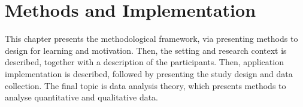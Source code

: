 \chapter{Methods and Implementation}\label{cha:Method}





This chapter presents the methodological framework, via presenting methods to design for learning and motivation. Then, the setting and research context is described, together with a description of the participants. Then, application implementation is described, followed by presenting the study design and data collection. The final topic is data analysis theory, which presents methods to analyse quantitative and qualitative data.













